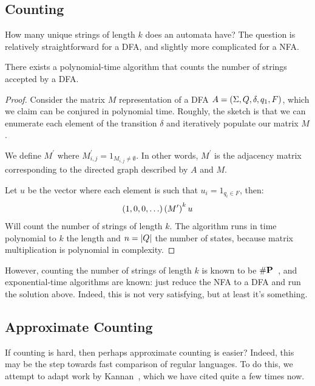 \subsection{Counting}
How many unique strings of length \(k\) does an automata have?
The question is relatively straightforward for a DFA,
and slightly more complicated for a NFA.

\begin{theorem}
  There exists a polynomial-time algorithm that counts the number of strings
  accepted by a DFA.
\end{theorem}
\begin{proof}
  Consider the matrix \(M\) representation of a
  DFA \(A = \left(\Sigma, Q, \delta, q_1, F\right)\),
  which we claim can be conjured in polynomial time.
  Roughly, the sketch is that we can enumerate each element
  of the transition \(\delta\) and iteratively populate our matrix \(M\).

  We define \(M^\prime\)
  where \(M^\prime _{i, j} = 1_{M_{i, j} \neq \emptyset}\).
  In other words, \(M^\prime\) is the adjacency
  matrix corresponding to the directed graph described by \(A\) and \(M\).

  Let \(u\) be the vector where each element is such that
  \(u_i = 1_{q_i \in F}\), then:
  \begin{align*}
    \left(1, 0, 0, \ldots\right) \left(M^\prime\right)^k u
  \end{align*}
  Will count the number of strings of length \(k\).
  The algorithm runs in time polynomial to \(k\) the length
  and \(n = \left\lvert Q\right\rvert\) the number of states,
  because matrix multiplication is polynomial in complexity.
\end{proof}

However, counting the number of strings of length \(k\) is known to be
\(\mathbf{\#P}\)~\cite{acmsiam-kannan1995counting},
and exponential-time algorithms are known:
just reduce the NFA to a DFA and run the solution above.
Indeed, this is not very satisfying, but at least it's something.

\subsection{Approximate Counting}
If counting is hard, then perhaps approximate counting is easier?
Indeed, this may be the step towards fast comparison of regular languages.
To do this,
we attempt to adapt work by Kannan~\cite{acmsiam-kannan1995counting},
which we have cited quite a few times now.

